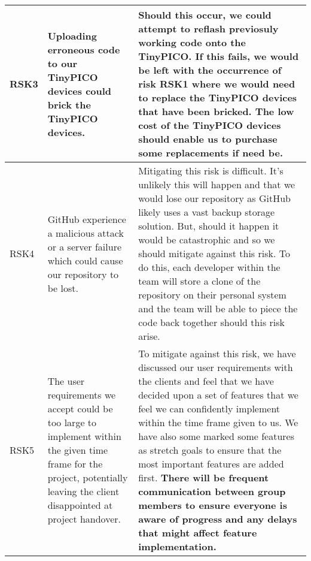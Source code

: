 \begin{xltabular}[H]{1.4\textwidth}{p{0.1\textwidth} | p{0.4\textwidth} | p{0.9\textwidth}}
    \midrule

    RSK3

    &

    Uploading erroneous code to our TinyPICO devices could brick the TinyPICO devices.

    &

    Should this occur, we could attempt to reflash previosuly working code onto the TinyPICO. If this fails, we would be left with the occurrence of risk RSK1 where we would need to replace the TinyPICO devices that have been bricked. The low cost of the TinyPICO devices should enable us to purchase some replacements if need be.\\

    \midrule

    RSK4

    &

    GitHub experience a malicious attack or a server failure which could cause our repository to be lost.

    &

    Mitigating this risk is difficult. It's unlikely this will happen and that we would lose our repository as GitHub likely uses a vast backup storage solution. But, should it happen it would be catastrophic and so we should mitigate against this risk. To do this, each developer within the team will store a clone of the repository on their personal system and the team will be able to piece the code back together should this risk arise.\\

    \midrule

    RSK5

    &

    The user requirements we accept could be too large to implement within the given time frame for the project, potentially leaving the client disappointed at project handover.

    &

    To mitigate against this risk, we have discussed our user requirements with the clients and feel that we have decided upon a set of features that we feel we can confidently implement within the time frame given to us. We have also some marked some features as stretch goals to ensure that the most important features are added first. \textbf{There will be frequent communication between group members to ensure everyone is aware of progress and any delays that might affect feature implementation.}\\


\end{xltabular}
